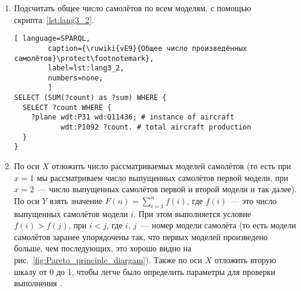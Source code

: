 
\begin{enumerate} 
  \item Подсчитать общее число самолётов по всем моделям, с помощью скрипта~\ref{lst:lang3_2}.
  
\begin{lstlisting}[ language=SPARQL, 
        caption={\ruwiki{vE9}{Общее число произведённых самолётов}\protect\footnotemark}, 
        label=lst:lang3_2, 
        numbers=none, 
        ]
SELECT (SUM(?count) as ?sum) WHERE {
  SELECT ?count WHERE {
    ?plane wdt:P31 wd:Q11436; # instance of aircraft
		   wdt:P1092 ?count. # total aircraft production
  }
}
\end{lstlisting}
  
  
  \item По оси $X$ отложить число рассматриваемых моделей самолётов 
      (то есть при $x = 1$ мы рассматриваем число выпущенных самолётов первой модели, 
        при $x = 2$~--- число выпущенных самолётов первой и второй модели и так далее). 
        По оси $Y$ взять значение $F(n) = \sum\limits_{i=1}^n f(i)$, 
        где $f(i)$~--- это число выпущенных самолётов модели $i$. 
        При этом выполняется условие $f(i) > f(j)$, при $i < j$, 
        где $i$, $j$~--- номер модели самолёта 
        (то есть модели самолётов заранее упорядочены так, что 
        первых моделей произведено больше, чем последующих, это хорошо видно на рис.~\ref{fig:Pareto_principle_diargam}). 
        Также по оси $X$ отложить вторую шкалу от 0 до 1, 
        чтобы легче было определить параметры для проверки выполнения .
\end{enumerate}

\begin{figure*}[h!]

    \setlength{\fboxsep}{0pt}%
    \setlength{\fboxrule}{1pt}%

	\caption{Процентное соотношение количества выпущенных моделей самолётов по $n$ моделям к общему числу выпущенных самолётов за всё время, 2020 год.}%
    \label{fig:Pareto_principle_diargam}%
\end{figure*}

